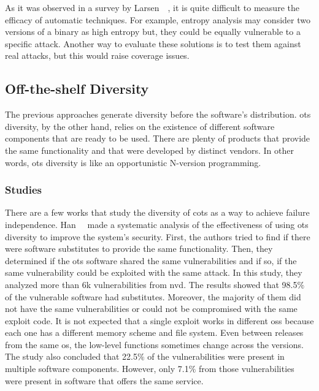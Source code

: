 As it was observed in a survey by Larsen~\etal{}~\cite{Larsen:2015}, it is quite difficult to measure the efficacy of automatic techniques.
For example, entropy analysis may consider two versions of a binary as high entropy but, they could be equally vulnerable to a specific attack.
Another way to evaluate these solutions is to test them against real attacks, but this would raise coverage issues.


\subsection{Off-the-shelf Diversity}
The previous approaches generate diversity before the software’s distribution. 
\gls{ots} diversity, by the other hand, relies on the existence of different software components that are ready to be used.
There are plenty of products that provide the same functionality and that were developed by distinct vendors. 
In other words, \gls{ots} diversity is like an opportunistic N-version programming.


\subsubsection{Studies}
There are a few works that study the diversity of \gls{cots} as a way to achieve failure independence.
Han~\etal{}~\cite{Han:2009} made a systematic analysis of the effectiveness of using \gls{ots} diversity to improve the system's security.
First, the authors tried to find if there were software substitutes to provide the same functionality. 
Then, they determined if the \gls{ots} software shared the same vulnerabilities and if so, if the same vulnerability could be exploited with the same attack. 
In this study, they analyzed more than 6k vulnerabilities from \gls{nvd}. 
The results showed that 98.5$\%$ of the vulnerable software had substitutes. 
Moreover, the majority of them did not have the same vulnerabilities or could not be compromised with the same exploit code. 
It is not expected that a single exploit works in different \glspl{os} because each one has a different memory scheme and file system. 
Even between releases from the same \gls{os}, the low-level functions sometimes change across the versions. 
The study also concluded that 22.5$\%$ of the vulnerabilities were present in multiple software components. 
However, only 7.1$\%$ from those vulnerabilities were present in software that offers the same service. 

